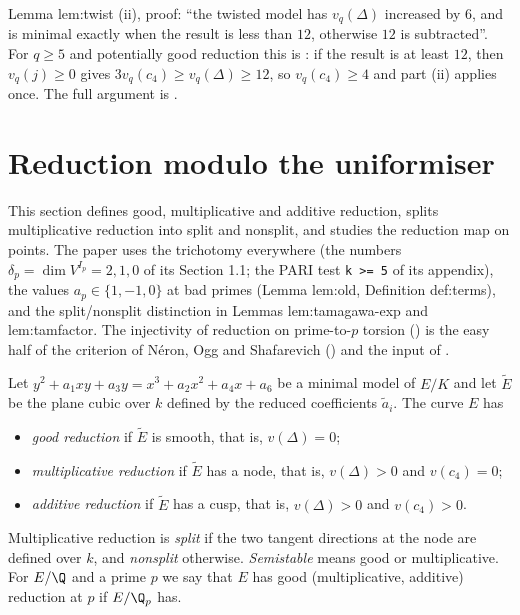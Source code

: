 \begin{paperlink}
Lemma lem:twist (ii), proof: ``the twisted model has $v_q(\Delta)$ increased by $6$, and is minimal exactly when
the result is less than $12$, otherwise $12$ is subtracted''. For $q\ge5$ and potentially good reduction this is
: if the result is at least $12$, then $v_q(j)\ge0$ gives
$3v_q(c_4)\ge v_q(\Delta)\ge12$, so $v_q(c_4)\ge4$ and part (ii) applies once. The full argument is
.
\end{paperlink}

\section{Reduction modulo the uniformiser}\label{sec:reduction:reduction}

This section defines good, multiplicative and additive reduction, splits multiplicative reduction into split
and nonsplit, and studies the reduction map on points. The paper uses the trichotomy everywhere (the numbers
$\delta_p=\dim V^{I_p}=2,1,0$ of its Section 1.1; the PARI test \texttt{k >= 5} of its appendix), the values
$a_p\in\{1,-1,0\}$ at bad primes (Lemma lem:old, Definition def:terms), and the split/nonsplit distinction in
Lemmas lem:tamagawa-exp and lem:tamfactor. The injectivity of reduction on prime-to-$p$ torsion
() is the easy half of the criterion of N\'eron, Ogg and Shafarevich
() and the input of .

\begin{definition}\label{def:reduction:types}
Let $y^2+a_1xy+a_3y=x^3+a_2x^2+a_4x+a_6$ be a minimal model of $E/K$ and let $\tilde E$ be the plane cubic over
$k$ defined by the reduced coefficients $\tilde a_i$. The curve $E$ has
\begin{itemize}
\item \emph{good reduction} if $\tilde E$ is smooth, that is, $v(\Delta)=0$;
\item \emph{multiplicative reduction} if $\tilde E$ has a node, that is, $v(\Delta)>0$ and $v(c_4)=0$;
\item \emph{additive reduction} if $\tilde E$ has a cusp, that is, $v(\Delta)>0$ and $v(c_4)>0$.
\end{itemize}
Multiplicative reduction is \emph{split} if the two tangent directions at the node are defined over $k$, and
\emph{nonsplit} otherwise. \emph{Semistable} means good or multiplicative. For $E/\Q$ and a prime $p$ we say
that $E$ has good (multiplicative, additive) reduction at $p$ if $E/\Q_p$ has.
\end{definition}

